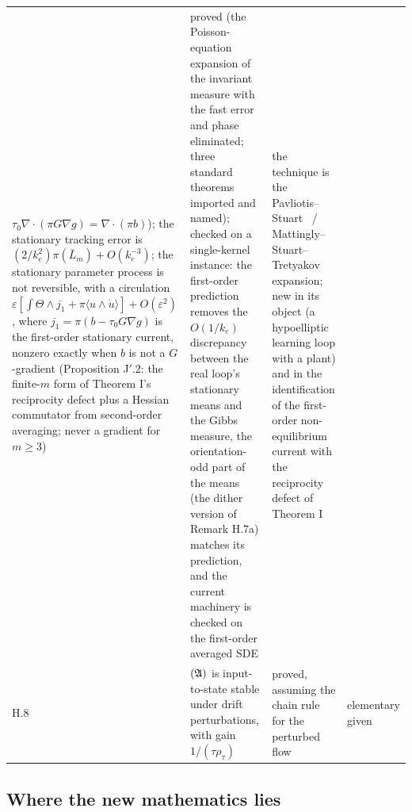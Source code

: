 {\begin{longtable}{@{}>{\raggedright\arraybackslash}p{}>{\raggedright\arraybackslash}p{}%
>{\raggedright\arraybackslash}p{}>{\raggedright\arraybackslash}p{}@{}}
$\tau_0\nabla\cdot(\pi G\nabla g) = \nabla\cdot(\pi b)$); the stationary tracking error is
$(2/k_e^2)\pi(\bar L_m) + O(k_e^{-3})$; the stationary parameter process is not reversible, with a circulation
$\varepsilon[\int\Theta\wedge j_1 + \pi\langle u\wedge\dot u\rangle] + O(\varepsilon^2)$, where
$j_1 = \pi(b - \tau_0G\nabla g)$ is the first-order stationary current, nonzero exactly when $b$ is not a
$G$-gradient (Proposition J$'$.2: the finite-$m$ form of Theorem I's reciprocity defect plus a Hessian commutator
from second-order averaging; never a gradient for $m\ge3$)
& proved (the Poisson-equation expansion of the invariant measure with the fast error and phase eliminated; three
standard theorems imported and named); checked on a single-kernel instance: the first-order prediction removes the
$O(1/k_e)$ discrepancy between the real loop's stationary means and the Gibbs measure, the orientation-odd part of
the means (the dither version of Remark H.7a) matches its prediction, and the current machinery is checked on the
first-order averaged SDE
& the technique is the Pavliotis--Stuart~\cite{S30} / Mattingly--Stuart--Tretyakov~\cite{S31} expansion; new in its
object (a hypoelliptic learning loop with a plant) and in the identification of the first-order non-equilibrium
current with the reciprocity defect of Theorem I\\
\addlinespace[0.5pt]
H.8 & $(\mathfrak{A})$ is input-to-state stable under drift perturbations, with gain $1/(\tau\rho_\tau)$
& proved, assuming the chain rule for the perturbed flow
& elementary given \cite{S3}\\
\end{longtable}
}

\subsection{Where the new mathematics lies}

